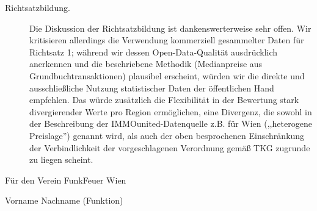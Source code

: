 \documentclass[parskip=half]{scrreprt}
\begin{document}
\begin{description}
\item[Richtsatzbildung.] Die Diskussion der Richtsatzbildung ist
dankenswerterweise sehr offen. Wir kritisieren allerdings die
Verwendung kommerziell gesammelter Daten für Richtsatz 1; während
wir dessen Open-Data-Qualität ausdrücklich anerkennen und die
beschriebene Methodik (Medianpreise aus Grundbuchtransaktionen)
plausibel erscheint, würden wir die direkte und ausschließliche
Nutzung statistischer Daten der öffentlichen Hand empfehlen.
Das würde zusätzlich die Flexibilität in der Bewertung stark
divergierender Werte pro Region ermöglichen, eine Divergenz,
die sowohl in der Beschreibung der IMMOunited-Datenquelle z.B.
für Wien (,,heterogene Preislage'') genannt wird, als auch der
oben besprochenen Einschränkung der Verbindlichkeit der vorgeschlagenen
Verordnung gemäß TKG zugrunde zu liegen scheint.

\end{description}

\vspace{1.5cm}

Für den Verein FunkFeuer Wien

Vorname Nachname (Funktion)
\end{document}
